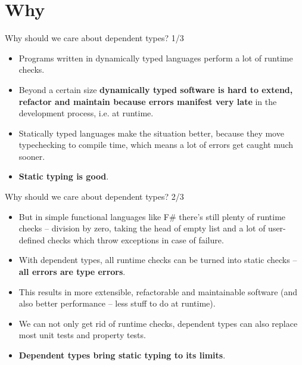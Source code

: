 \documentclass{beamer}
\begin{document}
\section{Why}

\begin{frame}{Why should we care about dependent types? 1/3}
\begin{itemize}
	\item Programs written in dynamically typed languages perform a lot of runtime checks.
	\item Beyond a certain size \textbf{dynamically typed software is hard to extend, refactor and maintain because errors manifest very late} in the development process, i.e. at runtime.
	\item Statically typed languages make the situation better, because they move typechecking to compile time, which means a lot of errors get caught much sooner.
	\item \textbf{Static typing is good}.
\end{itemize}
\end{frame}

\begin{frame}{Why should we care about dependent types? 2/3}
\begin{itemize}
	\item But in simple functional languages like F\# there's still plenty of runtime checks -- division by zero, taking the head of empty list and a lot of user-defined checks which throw exceptions in case of failure.
	\item With dependent types, all runtime checks can be turned into static checks -- \textbf{all errors are type errors}.
	\item This results in more extensible, refactorable and maintainable software (and also better performance -- less stuff to do at runtime).\item We can not only get rid of runtime checks, dependent types can also replace most unit tests and property tests.
	\item \textbf{Dependent types bring static typing to its limits}.
\end{itemize}
\end{frame}
\end{document}
